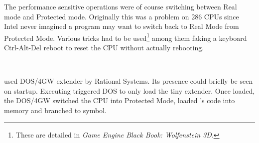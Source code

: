 The performance sensitive operations were of course switching between Real mode and Protected mode. Originally this was a problem on 286 CPUs since Intel never imagined a program may want to switch back to Real Mode from Protected Mode. Various tricks had to be used\footnote{These are detailed in \textit{Game Engine Black Book: Wolfenstein 3D}.} among them faking a keyboard Ctrl-Alt-Del reboot to reset the CPU without actually rebooting.\\
\par
{}\\
\par
{}
\par

\doom used DOS/4GW extender by Rational Systems. Its presence could briefly be seen on startup. Executing  triggered DOS to only load the tiny extender. Once loaded, the DOS/4GW switched the CPU into Protected Mode, loaded \doom's code into memory and branched to  symbol.\\
\par
{}





